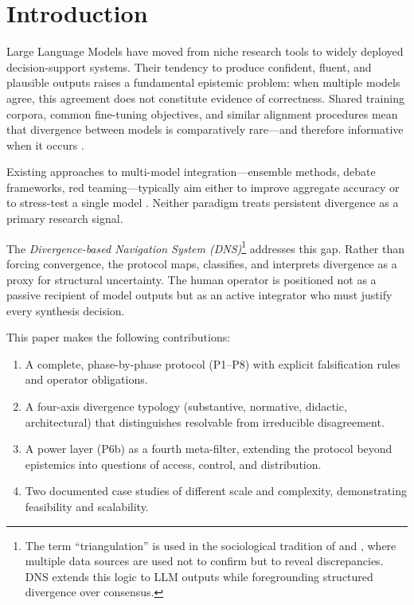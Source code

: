 \documentclass[10pt,a4paper]{article}
\begin{document}
\tableofcontents
\newpage

\section{Introduction}
\label{sec:intro}

Large Language Models have moved from niche research tools to widely deployed
decision-support systems. Their tendency to produce confident, fluent, and plausible
outputs raises a fundamental epistemic problem: when multiple models agree,
this agreement does not constitute evidence of correctness. Shared training corpora,
common fine-tuning objectives, and similar alignment procedures mean that divergence
between models is comparatively rare—and therefore informative when it occurs
\citep{denzin1970,Liang2024}.

Existing approaches to multi-model integration—ensemble methods, debate
frameworks, red teaming—typically aim either to improve aggregate accuracy or to
stress-test a single model \citep{Du2023,Perez2022}. Neither paradigm treats
persistent divergence as a primary research signal.

The \textit{Divergence-based Navigation System (DNS)}\footnote{The term
``triangulation'' is used in the sociological tradition of \citet{denzin1970} and
\citet{patton1999}, where multiple data sources are used not to confirm but to
reveal discrepancies. DNS extends this logic to LLM outputs while foregrounding
structured divergence over consensus.}
addresses this gap. Rather than forcing convergence, the protocol maps, classifies,
and interprets divergence as a proxy for structural uncertainty. The human operator
is positioned not as a passive recipient of model outputs but as an active
integrator who must justify every synthesis decision.

This paper makes the following contributions:
\begin{enumerate}[leftmargin=*, label=(\arabic*)]
  \item A complete, phase-by-phase protocol (P1–P8) with explicit falsification
        rules and operator obligations.
  \item A four-axis divergence typology (substantive, normative, didactic,
        architectural) that distinguishes resolvable from irreducible disagreement.
  \item A power layer (P6b) as a fourth meta-filter, extending the protocol beyond
        epistemics into questions of access, control, and distribution.
  \item Two documented case studies of different scale and complexity,
        demonstrating feasibility and scalability.
\end{enumerate}
\end{document}
